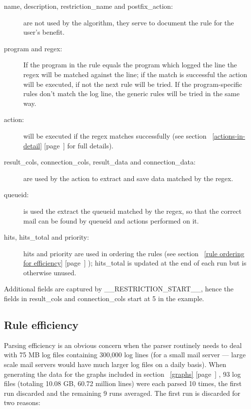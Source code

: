 \documentclass[a4paper,12pt,draft]{article}
\newcommand{\refwithpage}[1]{%
    \empty{}\ref{#1} [page~\pageref{#1}]%
}
\begin{document}
\begin{description}

    \item [name, description, restriction\_name and postfix\_action:] are
        not \newline used by the algorithm, they serve to document the rule
        for the user's benefit.

    \item [program and regex:] If the program in the rule equals the
        program which logged the line the regex will be matched against the
        line; if the match is successful the action will be executed, if not
        the next rule will be tried.  If the program-specific rules don't
        match the log line, the generic rules will be tried in the same
        way.

    \item [action:] will be executed if the regex matches successfully (see
        section~\refwithpage{actions-in-detail} for full details).

    \item [result\_cols, connection\_cols, result\_data and
        connection\_data:] are \newline used by the action to extract and
        save data matched by the regex.

    \item [queueid:] is used the extract the queueid matched by the regex,
        so that the correct mail can be found by queueid and actions
        performed on it.

    \item [hits, hits\_total and priority:] hits and priority are used in
        ordering the rules (see section~\refwithpage{rule ordering for
        efficiency}); hits\_total is updated at the end of each run but is
        otherwise unused.

\end{description}

Additional fields are captured by \_\_RESTRICTION\_START\_\_, hence the
fields in result\_cols and connection\_cols start at 5 in the example.

        
\subsection{Rule efficiency}

\label{rule efficiency}

Parsing efficiency is an obvious concern when the parser routinely needs to
deal with 75 MB log files containing 300,000 log lines (for a small mail
server --- large scale mail servers would have much larger log files on a
daily basis).  When generating the data for the graphs included in
section~\refwithpage{graphs}, 93 log files (totaling 10.08 GB, 60.72
million lines) were each parsed 10 times, the first run discarded and the
remaining 9 runs averaged.  The first run is discarded for two reasons:
\end{document}
